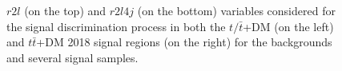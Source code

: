 \documentclass[a4paper, 10pt, openright]{report}
\begin{document}
\begin{itemize}
\begin{figure}[htbp]
\caption{$r2l$ (on the top) and $r2l4j$ (on the bottom) variables considered for the signal discrimination process in both the $t/ \bar t$+DM (on the left) and $t \bar t$+DM 2018 signal regions (on the right) for the backgrounds and several signal samples.}
\label{fig:r2l}
\end{figure}


\end{itemize}
\end{document}
